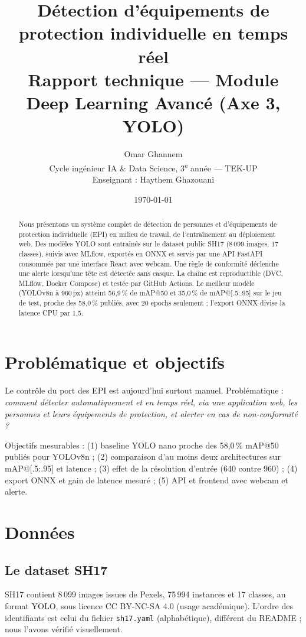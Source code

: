 \documentclass[11pt,a4paper]{article}
\title{Détection d'équipements de protection individuelle en temps réel\\
\large Rapport technique — Module Deep Learning Avancé (Axe 3, YOLO)}
\author{Omar Ghannem\\
Cycle ingénieur IA \& Data Science, 3\textsuperscript{e} année — TEK-UP\\
Enseignant : Haythem Ghazouani}
\date{\today}
\begin{document}
\maketitle
\begin{abstract}
Nous présentons un système complet de détection de personnes et d'équipements de protection
individuelle (EPI) en milieu de travail, de l'entraînement au déploiement web. Des modèles YOLO
sont entraînés sur le dataset public SH17 (8\,099 images, 17 classes), suivis avec MLflow,
exportés en ONNX et servis par une API FastAPI consommée par une interface React avec webcam.
Une règle de conformité déclenche une alerte lorsqu'une tête est détectée sans casque.
La chaîne est reproductible (DVC, MLflow, Docker Compose) et testée par GitHub Actions.
Le meilleur modèle (YOLOv8n à 960\,px) atteint 56,9\,\% de mAP@50 et 35,0\,\% de mAP@[.5:.95] sur le jeu de test, proche des 58,0\,\% publiés, avec 20 epochs seulement ; l'export ONNX divise la latence CPU par 1,5.
\end{abstract}

\section{Problématique et objectifs}
Le contrôle du port des EPI est aujourd'hui surtout manuel. Problématique : \emph{comment détecter
automatiquement et en temps réel, via une application web, les personnes et leurs équipements de
protection, et alerter en cas de non-conformité ?}

Objectifs mesurables : (1) baseline YOLO nano proche des 58,0\,\% mAP@50 publiés pour YOLOv8n ;
(2) comparaison d'au moins deux architectures sur mAP@[.5:.95] et latence ; (3) effet de la
résolution d'entrée (640 contre 960) ; (4) export ONNX et gain de latence mesuré ; (5) API et
frontend avec webcam et alerte.

\section{Données}
\subsection{Le dataset SH17}
SH17 \cite{sh17} contient 8\,099 images issues de Pexels, 75\,994 instances et 17 classes, au format
YOLO, sous licence CC BY-NC-SA 4.0 (usage académique). L'ordre des identifiants est celui du fichier
\texttt{sh17.yaml} (alphabétique), différent du README ; nous l'avons vérifié visuellement.
\end{document}

